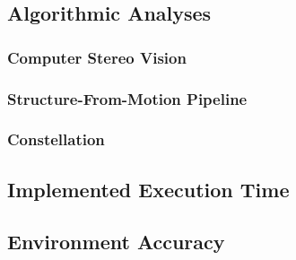 \subsection{Algorithmic Analyses}
\subsubsection{Computer Stereo Vision}
\subsubsection{Structure-From-Motion Pipeline}
\subsubsection{Constellation}

\subsection{Implemented Executi{}on Time}
\subsection{Environment Accuracy}